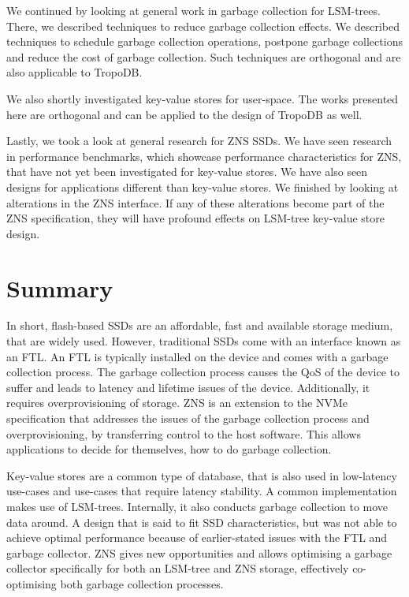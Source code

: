 We continued by looking at general work in garbage collection for LSM-trees. There, we described techniques to reduce garbage collection effects. We described techniques to schedule garbage collection operations, postpone garbage collections and reduce the cost of garbage collection. Such techniques are orthogonal and are also applicable to TropoDB. 

We also shortly investigated key-value stores for user-space. The works presented here are orthogonal and can be applied to the design of TropoDB as well.

Lastly, we took a look at general research for ZNS SSDs. We have seen research in performance benchmarks, which showcase performance characteristics for ZNS, that have not yet been investigated for key-value stores. We have also seen designs for applications different than key-value stores. We finished by looking at alterations in the ZNS interface. If any of these alterations become part of the ZNS specification, they will have profound effects on LSM-tree key-value store design.

\section{Summary}
In short, flash-based SSDs are an affordable, fast and available storage medium, that are widely used. However, traditional SSDs come with an interface known as an FTL. An FTL is typically installed on the device and comes with a garbage collection process. The garbage collection process causes the QoS of the device to suffer and leads to latency and lifetime issues of the device. Additionally, it requires overprovisioning of storage. ZNS is an extension to the NVMe specification that addresses the issues of the garbage collection process and overprovisioning, by transferring control to the host software. This allows applications to decide for themselves, how to do garbage collection. 

Key-value stores are a common type of database, that is also used in low-latency use-cases and use-cases that require latency stability. A common implementation makes use of LSM-trees. Internally, it also conducts garbage collection to move data around. A design that is said to fit SSD characteristics, but was not able to achieve optimal performance because of earlier-stated issues with the FTL and garbage collector. ZNS gives new opportunities and allows optimising a garbage collector specifically for both an LSM-tree and ZNS storage, effectively co-optimising both garbage collection processes.

